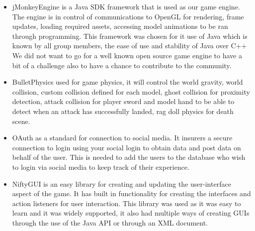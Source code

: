 \documentclass[letterpaper]{article}
\begin{document}
			\begin{itemize}
				\item jMonkeyEngine is a Java SDK framework that is used as our game engine. The engine is in control of communications to OpenGL for rendering, frame updates, loading required assets, accessing model animations to be ran through programming. This framework was chosen for it use of Java which is known by all group members, the ease of use and stability of Java over C++ We did not want to go for a well known open source game engine to have a bit of a challenge also to have a chance to contribute to the community.
				\item BulletPhysics used for game physics, it will control the world gravity, world collision, custom collision defined for each model, ghost collision for proximity detection, attack collision for player sword and model hand to be able to detect when an attack has successfully landed, rag doll physics for death scene.
				\item OAuth as a standard for connection to social media. It insurers a secure connection to login using your social login to obtain data and post data on behalf of the user. This is needed to add the users to the database who wish to login via social media to keep track of their experience.
				\item NiftyGUI is an easy library for creating and updating the user-interface aspect of the game. It has built in functionality for creating the interfaces and action listeners for user interaction. This library was used as it was easy to learn and it was widely supported, it also had multiple ways of creating GUIs through the use of the Java API or through an XML document.
			\end{itemize}
			
		\vspace{0.2in}
		\section*{\colorbox{blue}{}}
		\vspace{0.1in}
			
\end{document}

